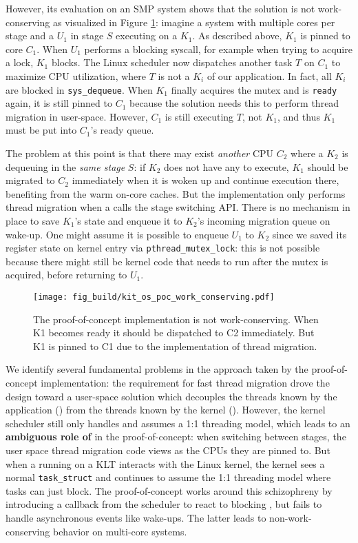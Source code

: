 \documentclass[12pt,a4paper]{book}
\begin{document}
However, its evaluation on an SMP system shows that the solution is not work-conserving as visualized in Figure \ref{fig:kit_os_poc_work_conserving}:
imagine a system with multiple cores per stage and a \ult $U_1$ in stage $S$ executing on a \klt $K_1$.
As described above, $K_1$ is pinned to core $C_1$.
When $U_1$ performs a blocking syscall, for example when trying to acquire a lock, $K_1$ blocks.
The Linux scheduler now dispatches another task $T$ on $C_1$ to maximize CPU utilization, where $T$ is not a $K_i$ of our application.
In fact, all $K_i$ are blocked in \texttt{sys\_dequeue}.
When $K_1$ finally acquires the mutex and is \texttt{ready} again, it is still pinned to $C_1$ because the solution needs this to perform thread migration in user-space.
However, $C_1$ is still executing $T$, not $K_1$, and thus $K_1$ must be put into $C_1$'s ready queue.

The problem at this point is that there may exist \emph{another} CPU $C_2$ where a \klt $K_2$ is dequeuing \ults in the \emph{same stage} $S$:
if $K_2$ does not have any \ults to execute, $K_1$ should be migrated to $C_2$ immediately when it is woken up and continue execution there, benefiting from the warm on-core caches.
But the implementation only performs thread migration when a \ult calls the stage switching API.
There is no mechanism in place to save $K_1$'s state and enqueue it to $K_2$'s incoming migration queue on wake-up.
One might assume it is possible to enqueue $U_1$ to $K_2$ since we saved its register state on kernel entry via \texttt{pthread\_mutex\_lock}:
this is not possible because there might still be kernel code that needs to run after the mutex is acquired, before returning to $U_1$.

\begin{figure}[h]
    \centering
    \texttt{[image: fig\_build/kit\_os\_poc\_work\_conserving.pdf]}
    \caption{The proof-of-concept implementation is not work-conserving. When K1 becomes ready it should be dispatched to C2 immediately. But K1 is pinned to C1 due to the implementation of thread migration.}
    \label{fig:kit_os_poc_work_conserving}
\end{figure}

We identify several fundamental problems in the approach taken by the proof-of-concept implementation:
the requirement for fast thread migration drove the design toward a user-space solution which decouples the threads known by the application (\ults) from the threads known by the kernel (\klts).
However, the kernel scheduler still only handles \klts and assumes a 1:1 threading model, which leads to an \textbf{ambiguous role of \klts} in the proof-of-concept:
when switching between stages, the user space thread migration code views \klts as the CPUs they are pinned to.
But when a \ult running on a KLT interacts with the Linux kernel, the kernel sees a normal \texttt{task\_struct} and continues to assume the 1:1 threading model where tasks can just block.
The proof-of-concept works around this schizophreny by introducing a callback from the scheduler to react to blocking \klts, but fails to handle asynchronous events like wake-ups.
The latter leads to non-work-conserving behavior on multi-core systems.
\end{document}
